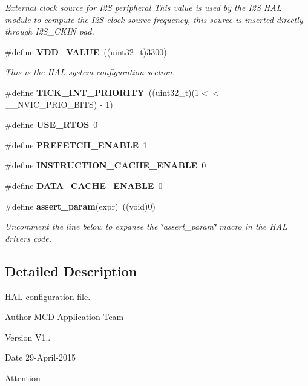\begin{DoxyCompactItemize}
\begin{DoxyCompactList}\small\item\em External clock source for I2S peripheral This value is used by the I2S H\+AL module to compute the I2S clock source frequency, this source is inserted directly through I2\+S\+\_\+\+C\+K\+IN pad. \end{DoxyCompactList}\item 
\#define \textbf{ V\+D\+D\+\_\+\+V\+A\+L\+UE}~((uint32\+\_\+t)3300)
\begin{DoxyCompactList}\small\item\em This is the H\+AL system configuration section. \end{DoxyCompactList}\item 
\#define \textbf{ T\+I\+C\+K\+\_\+\+I\+N\+T\+\_\+\+P\+R\+I\+O\+R\+I\+TY}~((uint32\+\_\+t)(1$<$$<$\+\_\+\+\_\+\+N\+V\+I\+C\+\_\+\+P\+R\+I\+O\+\_\+\+B\+I\+TS) -\/ 1)
\item 
\#define \textbf{ U\+S\+E\+\_\+\+R\+T\+OS}~0
\item 
\#define \textbf{ P\+R\+E\+F\+E\+T\+C\+H\+\_\+\+E\+N\+A\+B\+LE}~1
\item 
\#define \textbf{ I\+N\+S\+T\+R\+U\+C\+T\+I\+O\+N\+\_\+\+C\+A\+C\+H\+E\+\_\+\+E\+N\+A\+B\+LE}~0
\item 
\#define \textbf{ D\+A\+T\+A\+\_\+\+C\+A\+C\+H\+E\+\_\+\+E\+N\+A\+B\+LE}~0
\item 
\#define \textbf{ assert\+\_\+param}(expr)~((void)0)
\begin{DoxyCompactList}\small\item\em Uncomment the line below to expanse the \char`\"{}assert\+\_\+param\char`\"{} macro in the H\+AL drivers code. \end{DoxyCompactList}\end{DoxyCompactItemize}


\subsection{Detailed Description}
H\+AL configuration file. 

\begin{DoxyAuthor}{Author}
M\+CD Application Team 
\end{DoxyAuthor}
\begin{DoxyVersion}{Version}
V1.. 
\end{DoxyVersion}
\begin{DoxyDate}{Date}
29-\/\+April-\/2015 
\end{DoxyDate}
\begin{DoxyAttention}{Attention}

\end{DoxyAttention}
